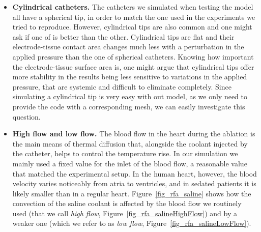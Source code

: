 \begin{itemize}
  \item \textbf{Cylindrical catheters.} The catheters we simulated when testing the model all have a spherical tip, in order to match the one used in the experiments we tried to reproduce. However, cylindrical tips are also common and one might ask if one of is better than the other. Cylindrical tips are flat and their electrode-tissue contact area changes much less with a perturbation in the applied pressure than the one of spherical catheters. Knowing how important the electrode-tissue surface area is, one might argue that cylindrical tips offer more stability in the results being less sensitive to variations in the applied pressure, that are systemic and difficult to eliminate completely. Since simulating a cylindrical tip is very easy with out model, as we only need to provide the code with a corresponding mesh, we can easily investigate this question.
  \item \textbf{High flow and low flow.} The blood flow in the heart during the ablation is the main means of thermal diffusion that, alongside the coolant injected by the catheter, helps to control the temperature rise. In our simulation we mainly used a fixed value for the inlet of the blood flow, a reasonable value that matched the experimental setup. In the human heart, however, the blood velocity varies noticeably from atria to ventricles, and in sedated patients it is likely smaller than in a regular heart. Figure~\ref{fig_rfa_saline} shows how the convection of the saline coolant is affected by the blood flow we routinely used (that we call \emph{high flow}, Figure~\ref{fig_rfa_salineHighFlow}) and by a weaker one (which we refer to as \emph{low flow}, Figure~\ref{fig_rfa_salineLowFlow}).
    \begin{figure}
      \centering
      \quad

\end{figure}
\end{itemize}
